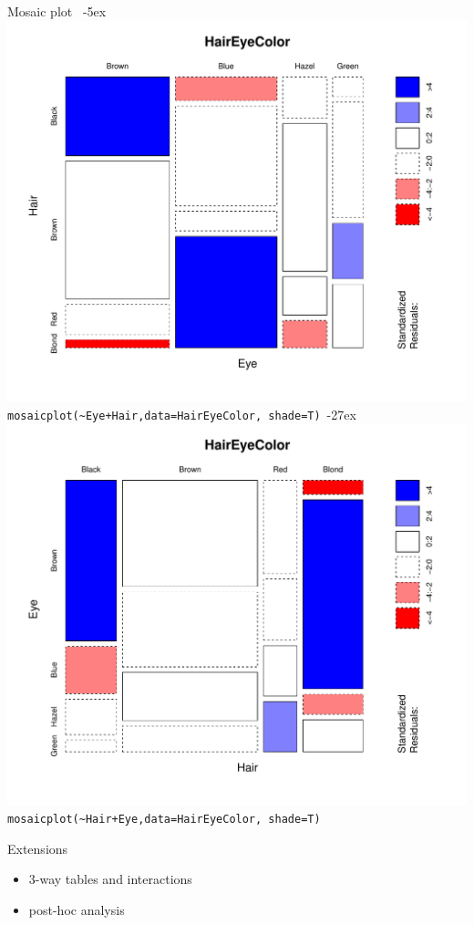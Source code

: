 \documentclass[smaller]{beamer}
\begin{document}
\begin{frame}[fragile]{Mosaic plot}
\hbox{
    \kern-5ex\vbox{
        \includegraphics[scale=0.3]{14_Eye_Hair.pdf}\\
        {\tiny \verb'mosaicplot(~Eye+Hair,data=HairEyeColor, shade=T)'}
    }
    \kern-27ex\vbox{
        \includegraphics[scale=0.3]{14_Hair_Eye.pdf}\\
        {\tiny \verb'mosaicplot(~Hair+Eye,data=HairEyeColor, shade=T)'}
    }
}    
\end{frame}

\begin{frame}{Extensions}
\begin{itemize}
 \item 3-way tables and interactions
 \item post-hoc analysis
\end{itemize}
 
\end{frame}
\end{document}
